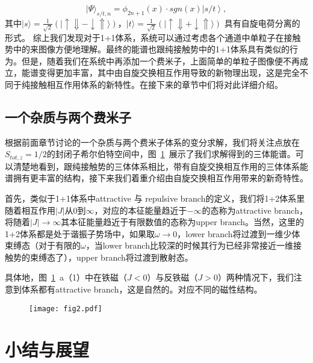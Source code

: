 \begin{equation}
|\Psi\rangle_{s/t,n} = \phi_{2n+1}(x) \cdot sgn(x)\left| s/t \right>, \label{asymptotic_wf}
\end{equation}
其中$|s\rangle = \frac{1}{\sqrt{2}}(|\uparrow\Downarrow - \downarrow\Uparrow\rangle)$，$|t\rangle = \frac{1}{\sqrt{2}}(|\uparrow\Downarrow + \downarrow\Uparrow\rangle)$ 具有自旋电荷分离的形式。
综上我们发现对于1+1体系，系统可以通过考虑各个通道中单粒子在接触势中的来图像方便地理解。最终的能谱也跟纯接触势中的1+1体系\cite{busch1998two}具有类似的行为。但是，随着我们在系统中再添加一个费米子，上面简单的单粒子图像便不再成立，能谱变得更加丰富，其中由自旋交换相互作用导致的新物理出现，这是完全不同于纯接触相互作用体系的新特性。在接下来的章节中们将对此详细介绍。

\subsection{一个杂质与两个费米子}
根据前面章节讨论的一个杂质与两个费米子体系的变分求解，我们将关注点放在$S_{tot,z}=1/2$的封闭子希尔伯特空间中，图~\ref{fig:fig2}~展示了我们求解得到的三体能谱。可以清楚地看到，跟纯接触势的三体体系相比，带有自旋交换相互作用的三体体系能谱拥有更丰富的结构，接下来我们着重介绍由自旋交换相互作用带来的新奇特性。

首先，类似于1+1体系中attractive 与 repulsive branch的定义，我们将1+2体系里随着相互作用$|J|$从$0$到$\infty$，对应的本征能量趋近于$-\infty$的态称为attractive branch，将随着$|J|\to\infty$其本征能量趋近于有限数值的态称为upper branch。当然，这里的1+2体系都是处于谐振子势场中，如果取$\omega\to 0$，lower branch将过渡到一维少体束缚态（对于有限的$\omega$，当lower branch比较深的时候其行为已经非常接近一维接触势的束缚态了），upper branch将过渡到散射态。

具体地，图~\ref{fig:fig2}~a（1）中在铁磁（$J<0$）与反铁磁（$J>0$）两种情况下，我们注意到体系都有attractive branch，这是自然的。对应不同的磁性结构。

\begin{figure}[!htbp]
    \centering
    \texttt{[image: fig2.pdf]}
    \label{fig:fig2}
\end{figure}


\section{小结与展望}\label{sec:spex-summary}

